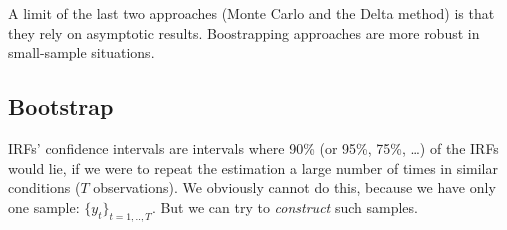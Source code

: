 \documentclass[
  12pt,
]{book}
\newenvironment{Shaded}{\begin{snugshade}}{\end{snugshade}}
\newcommand{\AttributeTok}[1]{\textcolor[rgb]{0.77,0.63,0.00}{#1}}
\newcommand{\ConstantTok}[1]{\textcolor[rgb]{0.00,0.00,0.00}{#1}}
\newcommand{\ControlFlowTok}[1]{\textcolor[rgb]{0.13,0.29,0.53}{\textbf{#1}}}
\newcommand{\DecValTok}[1]{\textcolor[rgb]{0.00,0.00,0.81}{#1}}
\newcommand{\FloatTok}[1]{\textcolor[rgb]{0.00,0.00,0.81}{#1}}
\newcommand{\FunctionTok}[1]{\textcolor[rgb]{0.00,0.00,0.00}{#1}}
\newcommand{\NormalTok}[1]{#1}
\newcommand{\OtherTok}[1]{\textcolor[rgb]{0.56,0.35,0.01}{#1}}
\newcommand{\SpecialCharTok}[1]{\textcolor[rgb]{0.00,0.00,0.00}{#1}}
\theoremstyle{definition}
\theoremstyle{definition}
\theoremstyle{definition}
\theoremstyle{definition}
\theoremstyle{remark}
\begin{document}
\begin{Shaded}
\end{Shaded}

A limit of the last two approaches (Monte Carlo and the Delta method) is that they rely on asymptotic results. Boostrapping approaches are more robust in small-sample situations.

\hypertarget{Bootstrap}{%
\subsection{Bootstrap}\label{Bootstrap}}

IRFs' confidence intervals are intervals where 90\% (or 95\%, 75\%, \ldots) of the IRFs would lie, if we were to repeat the estimation a large number of times in similar conditions (\(T\) observations). We obviously cannot do this, because we have only one sample: \(\{y_t\}_{t=1,..,T}\). But we can try to \emph{construct} such samples.
\end{document}
